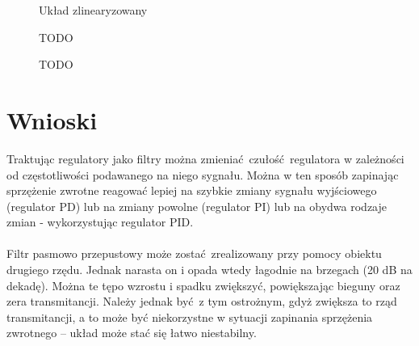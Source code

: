 \documentclass[a4paper, 10pt]{article}
\begin{document}
				
				\begin{figure}[H]
					\centering
					\def \svgwidth{0.75\columnwidth}
					
					\caption{Układ zlinearyzowany}
				\end{figure}\noindent
				
				
				\begin{figure}[H]
					\centering
					\def \svgwidth{0.75\columnwidth}
					\caption{TODO}
				\end{figure}\noindent
				
				
				\begin{figure}[H]
					\centering
					\def \svgwidth{0.75\columnwidth}
					
					\caption{TODO}
				\end{figure}\noindent
		

	\section{Wnioski}
		Traktując regulatory jako filtry można zmieniać czułość regulatora w zależności od częstotliwości podawanego na niego sygnału. Można w ten sposób zapinając sprzężenie zwrotne reagować lepiej na szybkie zmiany sygnału wyjściowego (regulator PD) lub na zmiany powolne (regulator PI) lub na obydwa rodzaje zmian - wykorzystując regulator PID.
		\\ \\
		Filtr pasmowo przepustowy może zostać zrealizowany przy pomocy obiektu drugiego rzędu. Jednak narasta on i opada wtedy  łagodnie na brzegach (20 dB na dekadę). Można te tępo wzrostu i spadku zwiększyć, powiększając bieguny oraz zera transmitancji. Należy jednak być z tym ostrożnym, gdyż zwiększa to rząd transmitancji, a to może być niekorzystne w sytuacji zapinania sprzężenia zwrotnego -- układ może stać się łatwo niestabilny.
		
\end{document}
